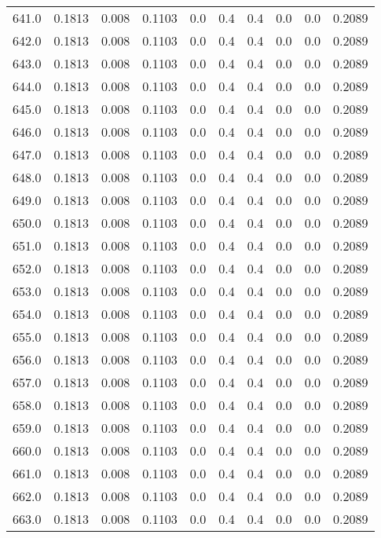 \begin{longtable}{lrrrrrrrrr}
641.0 & 0.1813 & 0.008 & 0.1103 & 0.0 & 0.4 & 0.4 & 0.0 & 0.0 & 0.2089 \\
642.0 & 0.1813 & 0.008 & 0.1103 & 0.0 & 0.4 & 0.4 & 0.0 & 0.0 & 0.2089 \\
643.0 & 0.1813 & 0.008 & 0.1103 & 0.0 & 0.4 & 0.4 & 0.0 & 0.0 & 0.2089 \\
644.0 & 0.1813 & 0.008 & 0.1103 & 0.0 & 0.4 & 0.4 & 0.0 & 0.0 & 0.2089 \\
645.0 & 0.1813 & 0.008 & 0.1103 & 0.0 & 0.4 & 0.4 & 0.0 & 0.0 & 0.2089 \\
646.0 & 0.1813 & 0.008 & 0.1103 & 0.0 & 0.4 & 0.4 & 0.0 & 0.0 & 0.2089 \\
647.0 & 0.1813 & 0.008 & 0.1103 & 0.0 & 0.4 & 0.4 & 0.0 & 0.0 & 0.2089 \\
648.0 & 0.1813 & 0.008 & 0.1103 & 0.0 & 0.4 & 0.4 & 0.0 & 0.0 & 0.2089 \\
649.0 & 0.1813 & 0.008 & 0.1103 & 0.0 & 0.4 & 0.4 & 0.0 & 0.0 & 0.2089 \\
650.0 & 0.1813 & 0.008 & 0.1103 & 0.0 & 0.4 & 0.4 & 0.0 & 0.0 & 0.2089 \\
651.0 & 0.1813 & 0.008 & 0.1103 & 0.0 & 0.4 & 0.4 & 0.0 & 0.0 & 0.2089 \\
652.0 & 0.1813 & 0.008 & 0.1103 & 0.0 & 0.4 & 0.4 & 0.0 & 0.0 & 0.2089 \\
653.0 & 0.1813 & 0.008 & 0.1103 & 0.0 & 0.4 & 0.4 & 0.0 & 0.0 & 0.2089 \\
654.0 & 0.1813 & 0.008 & 0.1103 & 0.0 & 0.4 & 0.4 & 0.0 & 0.0 & 0.2089 \\
655.0 & 0.1813 & 0.008 & 0.1103 & 0.0 & 0.4 & 0.4 & 0.0 & 0.0 & 0.2089 \\
656.0 & 0.1813 & 0.008 & 0.1103 & 0.0 & 0.4 & 0.4 & 0.0 & 0.0 & 0.2089 \\
657.0 & 0.1813 & 0.008 & 0.1103 & 0.0 & 0.4 & 0.4 & 0.0 & 0.0 & 0.2089 \\
658.0 & 0.1813 & 0.008 & 0.1103 & 0.0 & 0.4 & 0.4 & 0.0 & 0.0 & 0.2089 \\
659.0 & 0.1813 & 0.008 & 0.1103 & 0.0 & 0.4 & 0.4 & 0.0 & 0.0 & 0.2089 \\
660.0 & 0.1813 & 0.008 & 0.1103 & 0.0 & 0.4 & 0.4 & 0.0 & 0.0 & 0.2089 \\
661.0 & 0.1813 & 0.008 & 0.1103 & 0.0 & 0.4 & 0.4 & 0.0 & 0.0 & 0.2089 \\
662.0 & 0.1813 & 0.008 & 0.1103 & 0.0 & 0.4 & 0.4 & 0.0 & 0.0 & 0.2089 \\
663.0 & 0.1813 & 0.008 & 0.1103 & 0.0 & 0.4 & 0.4 & 0.0 & 0.0 & 0.2089 \\

\end{longtable}

